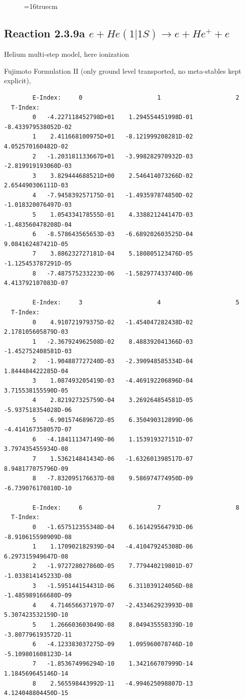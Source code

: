 \documentclass[12pt,dvips]{article}
\begin{document}
\begin{figure} \label{2.2.14}
\epsfxsize=16truecm
\end{figure}
\newpage




\subsection{
Reaction 2.3.9a  $e + He(1|1S) \rightarrow  e + He^+ + e $
}
Helium multi-step model, here ionization

 Fujimoto Formulation II (only ground level transported, no meta-stables
 kept explicit), \cite{kn:Fujimoto}



\begin{small}\begin{verbatim}
        E-Index:     0                     1                     2
  T-Index:
        0   -4.227118452798D+01    1.294554451998D-01   -8.433979538052D-02
        1    2.411668100975D+01   -8.121999208281D-02    4.052570160482D-02
        2   -1.203181133667D+01   -3.998282970932D-03   -2.819919193060D-03
        3    3.829444688521D+00    2.546414073266D-02    2.654490306111D-03
        4   -7.945839257175D-01   -1.493597874850D-02   -1.018320076497D-03
        5    1.054334178555D-01    4.338821244147D-03   -1.483560478208D-04
        6   -8.578643565653D-03   -6.689202603525D-04    9.084162487421D-05
        7    3.886232727181D-04    5.180805123476D-05   -1.125453787291D-05
        8   -7.487575233223D-06   -1.582977433740D-06    4.413792107083D-07

        E-Index:     3                     4                     5
  T-Index:
        0    4.910721979375D-02   -1.454047282438D-02    2.178105605879D-03
        1   -2.367924962508D-02    8.488392041366D-03   -1.452752408581D-03
        2   -1.904887727240D-03   -2.390948585334D-04    1.844484422285D-04
        3    1.087493205419D-03   -4.469192206896D-04    3.715538155590D-05
        4    2.821927325759D-04    3.269264854581D-05   -5.937518354028D-06
        5   -6.901574689672D-05    6.350490312899D-06   -4.414167358057D-07
        6   -4.184111347149D-06    1.153919327151D-07    3.797435455934D-08
        7    1.536214841434D-06   -1.632601398517D-07    8.948177075796D-09
        8   -7.832095176637D-08    9.586974774950D-09   -6.739076170810D-10

        E-Index:     6                     7                     8
  T-Index:
        0   -1.657512355348D-04    6.161429564793D-06   -8.910615590909D-08
        1    1.170902182939D-04   -4.410479245308D-06    6.297315949647D-08
        2   -1.972728027860D-05    7.779440219801D-07   -1.033814145233D-08
        3   -1.595144154431D-06    6.311039124056D-08   -1.485989166680D-09
        4    4.714656637197D-07   -2.433462923993D-08    5.307423532159D-10
        5    1.266603603049D-08    8.049435558339D-10   -3.807796193572D-11
        6   -4.123383037275D-09    1.095960078746D-10   -5.109801608123D-14
        7   -1.853674996294D-10    1.342166707999D-14    1.184569645146D-14
        8    2.565598443992D-11   -4.994625098807D-13    4.124048804450D-15


\end{verbatim}
\end{small}
\end{document}
